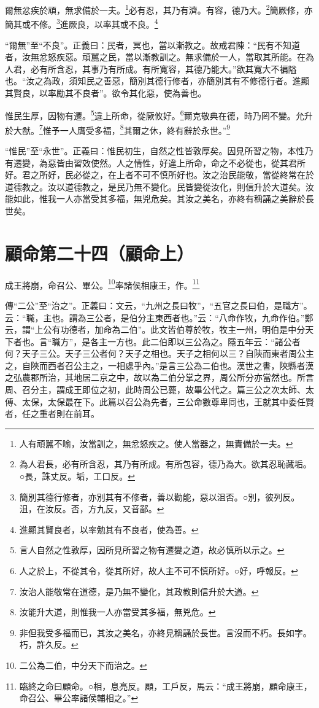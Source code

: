 爾無忿疾於頑，無求備於一夫。\footnote{人有頑嚚不喻，汝當訓之，無忿怒疾之。使人當器之，無責備於一夫。}必有忍，其乃有濟。有容，德乃大。\footnote{為人君長，必有所含忍，其乃有所成。有所包容，德乃為大。欲其忍恥藏垢。○長，誅丈反。垢，工口反。}簡厥修，亦簡其或不修。\footnote{簡別其德行修者，亦別其有不修者，善以勸能，惡以沮否。○別，彼列反。沮，在汝反。否，方九反，又音鄙。}進厥良，以率其或不良。\footnote{進顯其賢良者，以率勉其有不良者，使為善。}

{\noindent\shu{}\fzkt “爾無”至“不良”。正義曰：民者，冥也，當以漸教之。故戒君陳：“民有不知道者，汝無忿怒疾惡。頑嚚之民，當以漸教訓之。無求備於一人，當取其所能。在為人君，必有所含忍，其事乃有所成。有所寬容，其德乃能大。”欲其寬大不褊隘也。“汝之為政，須知民之善惡，簡別其德行修者，亦簡別其有不修德行者。進顯其賢良，以率勵其不良者”。欲令其化惡，使為善也。 \par}

惟民生厚，因物有遷。\footnote{言人自然之性敦厚，因所見所習之物有遷變之道，故必慎所以示之。}違上所命，從厥攸好。\footnote{人之於上，不從其令，從其所好，故人主不可不慎所好。○好，呼報反。}爾克敬典在德，時乃罔不變。允升於大猷。\footnote{汝治人能敬常在道德，是乃無不變化，其政教則信升於大道。}惟予一人膺受多福，\footnote{汝能升大道，則惟我一人亦當受其多福，無兇危。}其爾之休，終有辭於永世。”\footnote{非但我受多福而已，其汝之美名，亦終見稱誦於長世。言沒而不朽。長如字。朽，許久反。}

{\noindent\shu{}\fzkt “惟民”至“永世”。正義曰：惟民初生，自然之性皆敦厚矣。因見所習之物，本性乃有遷變，為惡皆由習效使然。人之情性，好違上所命，命之不必從也，從其君所好。君之所好，民必從之，在上者不可不慎所好也。汝之治民能敬，當從終常在於道德教之。汝以道德教之，是民乃無不變化。民皆變從汝化，則信升於大道矣。汝能如此，惟我一人亦當受其多福，無兇危矣。其汝之美名，亦終有稱誦之美辭於長世矣。 \par}

\section{顧命第二十四（顧命上）}


成王將崩，命召公、畢公。\footnote{二公為二伯，中分天下而治之。}率諸侯相康王，作。\footnote{臨終之命曰顧命。○相，息亮反。顧，工戶反，馬云：“成王將崩，顧命康王，命召公、畢公率諸侯輔相之。”}


{\noindent\zhuan{}\fzbyks 傳“二公”至“治之”。正義曰：文云，“九州之長曰牧”，“五官之長曰伯，是職方”。云：“職，主也。謂為三公者，是伯分主東西者也。”云：“八命作牧，九命作伯。”鄭云，謂“上公有功德者，加命為二伯”。此文皆伯尊於牧，牧主一州，明伯是中分天下者也。言“職方”，是各主一方也。此二伯即以三公為之。隱五年云：“諸公者何？天子三公。天子三公者何？天子之相也。天子之相何以三？自陝而東者周公主之，自陝而西者召公主之，一相處乎內。”是言三公為二伯也。漢世之書，陝縣者漢之弘農郡所治，其地居二京之中，故以為二伯分掌之界，周公所分亦當然也。所言周、召分主，謂成王即位之初，此時周公已薨，故畢公代之。篇三公之次太師、太傅、太保，太保最在下。此篇以召公為先者，三公命數尊卑同也，王就其中委任賢者，任之重者則在前耳。 \par}

